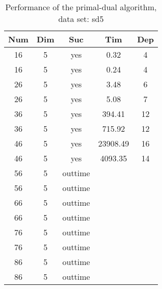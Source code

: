 \begin{table}[!htb]
  \centering
  \begin{tabular}[center]{|c|c|c|c|c|}
    \hline
    Num & Dim & Suc & Tim & Dep \\
    \hline
    16 & 5 & yes & 0.32 & 4 \\
    16 & 5 & yes & 0.24 & 4 \\
    26 & 5 & yes & 3.48 & 6 \\
    26 & 5 & yes & 5.08 & 7 \\
    36 & 5 & yes & 394.41 & 12 \\
    36 & 5 & yes & 715.92 & 12 \\
    46 & 5 & yes & 23908.49 & 16 \\
    46 & 5 & yes & 4093.35 & 14 \\
    56 & 5 & outtime & &\\
    56 & 5 & outtime & &\\
    66 & 5 & outtime & &\\
    66 & 5 & outtime & &\\
    76 & 5 & outtime & &\\
    76 & 5 & outtime & &\\
    86 & 5 & outtime & &\\
    86 & 5 & outtime & &\\
    \hline
  \end{tabular}
  \caption{Performance of the primal-dual algorithm, data set: sd5}
  \label{tab:test.pd-sd5}
\end{table}

